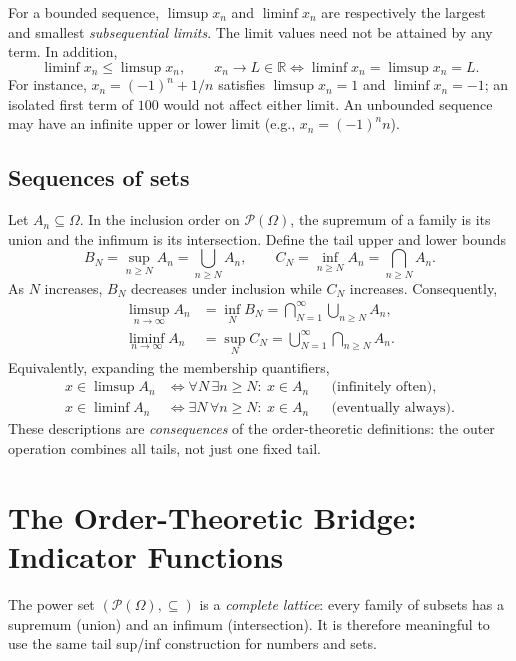 \documentclass[10pt,a4paper]{article}
\newcommand{\R}{\mathbb R}
\newcommand{\PO}{\mathcal P(\Omega)}
\begin{document}
For a bounded sequence, $\limsup x_n$ and $\liminf x_n$ are respectively the largest and smallest \emph{subsequential limits}. The limit values need not be attained by any term. In addition,
\[
\liminf x_n\le\limsup x_n,\qquad
x_n\to L\in\R\iff\liminf x_n=\limsup x_n=L.
\]
For instance, $x_n=(-1)^n+1/n$ satisfies $\limsup x_n=1$ and $\liminf x_n=-1$; an isolated first term of $100$ would not affect either limit. An unbounded sequence may have an infinite upper or lower limit (e.g., $x_n=(-1)^n n$).

\subsection{Sequences of sets}
Let $A_n\subseteq\Omega$. In the inclusion order on $\PO$, the supremum of a family is its union and the infimum is its intersection. Define the tail upper and lower bounds
\[
B_N=\sup_{n\ge N}A_n=\bigcup_{n\ge N}A_n,\qquad
C_N=\inf_{n\ge N}A_n=\bigcap_{n\ge N}A_n.
\]
As $N$ increases, $B_N$ decreases under inclusion while $C_N$ increases. Consequently,
\[
\boxed{\begin{aligned}
\limsup_{n\to\infty}A_n&=\inf_N B_N=\bigcap_{N=1}^{\infty}\bigcup_{n\ge N}A_n,\\
\liminf_{n\to\infty}A_n&=\sup_N C_N=\bigcup_{N=1}^{\infty}\bigcap_{n\ge N}A_n.
\end{aligned}}
\]
Equivalently, expanding the membership quantifiers,
\[
\begin{aligned}
x\in\limsup A_n&\iff \forall N\,\exists n\ge N:\ x\in A_n
&&\text{(infinitely often)},\\
x\in\liminf A_n&\iff \exists N\,\forall n\ge N:\ x\in A_n
&&\text{(eventually always)}.
\end{aligned}
\]
These descriptions are \emph{consequences} of the order-theoretic definitions: the outer operation combines all tails, not just one fixed tail.

\section{The Order-Theoretic Bridge: Indicator Functions}
The power set $(\PO,\subseteq)$ is a \emph{complete lattice}: every family of subsets has a supremum (union) and an infimum (intersection). It is therefore meaningful to use the same tail sup/inf construction for numbers and sets.
\end{document}
